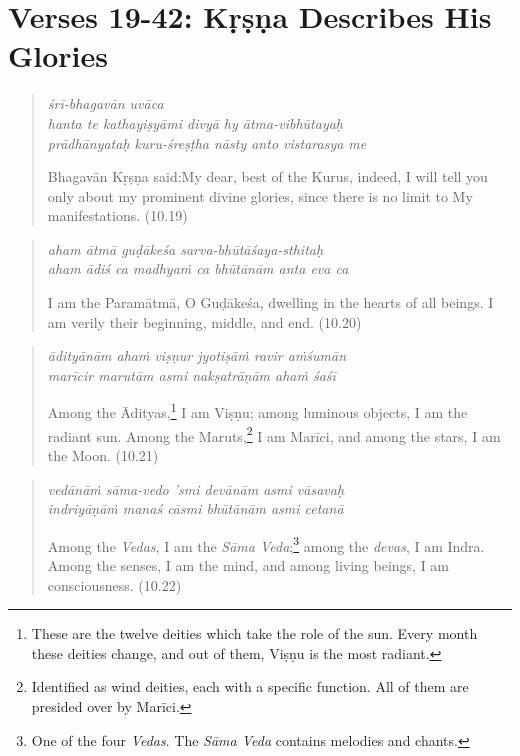 \documentclass[12pt, twoside, openright]{memoir}
\begin{document}
\section{Verses 19-42: Kṛṣṇa Describes His Glories}\label{sec-verses-19-42-krsna-describes-his-glories}


\par
\begin{verse}
\textit{śrī-bhagavān uvāca} \\
\textit{hanta te kathayiṣyāmi divyā hy ātma-vibhūtayaḥ} \\
\textit{prādhānyataḥ kuru-śreṣṭha nāsty anto vistarasya me}

\noindent \quad Bhagavān Kṛṣṇa said:\linebreak My dear, best of the Kurus, indeed, I will tell you only about my prominent divine glories, since there is no limit to My manifestations. (10.19)
\end{verse}
\par



\par
\begin{verse}
\textit{aham ātmā guḍākeśa sarva-bhūtāśaya-sthitaḥ} \\
\textit{aham ādiś ca madhyaṁ ca bhūtānām anta eva ca}

\noindent I am the Paramātmā, O Guḍākeśa, dwelling in the hearts of all beings. I am verily their beginning, middle, and end. (10.20)
\end{verse}
\par



\par
\begin{verse}
\textit{ādityānām ahaṁ viṣṇur jyotiṣāṁ ravir aṁśumān} \\
\textit{marīcir marutām asmi nakṣatrāṇām ahaṁ śaśī}

\noindent Among the Ādityas,\footnote{These are the twelve deities which take the role of the sun. Every month these deities change, and out of them, Viṣṇu is the most radiant.} I am Viṣṇu; among luminous objects, I am the radiant sun. Among the Maruts,\footnote{Identified as wind deities, each with a specific function. All of them are presided over by Marīci.} I am Marīci, and among the stars, I am the Moon. (10.21)
\end{verse}
\par



\par
\begin{verse}
\textit{vedānāṁ sāma-vedo ’smi devānām asmi vāsavaḥ} \\
\textit{indriyāṇāṁ manaś cāsmi bhūtānām asmi cetanā}

\noindent Among the \textit{Vedas}, I am the \textit{Sāma Veda};\footnote{One of the four \textit{Vedas}. The \textit{Sāma Veda} contains melodies and chants.} among the \textit{devas}, I am Indra. Among the senses, I am the mind, and among living beings, I am consciousness. (10.22)
\end{verse}
\par
\end{document}
